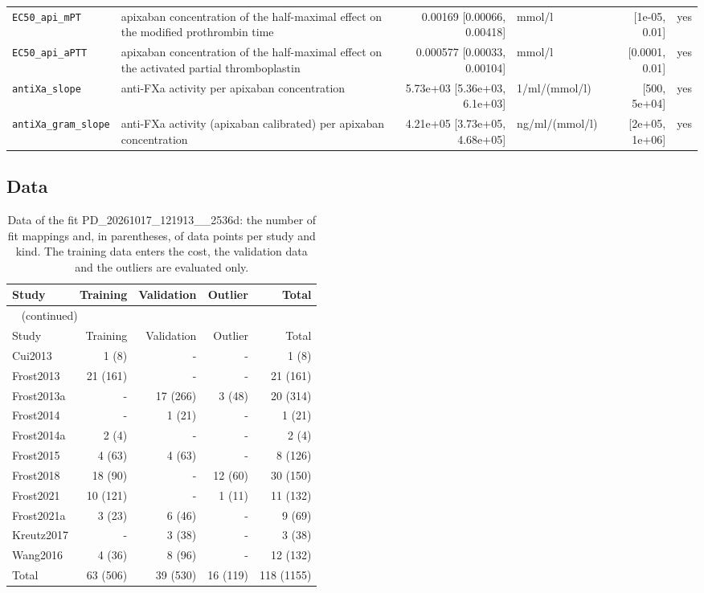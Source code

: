 \begin{longtable}{llrlrl}
\texttt{EC50\_api\_mPT} & apixaban concentration of the half-maximal effect on the modified prothrombin time & 0.00169 [0.00066, 0.00418] & mmol/l & [1e-05, 0.01] & yes \\
\texttt{EC50\_api\_aPTT} & apixaban concentration of the half-maximal effect on the activated partial thromboplastin & 0.000577 [0.00033, 0.00104] & mmol/l & [0.0001, 0.01] & yes \\
\texttt{antiXa\_slope} & anti-FXa activity per apixaban concentration & 5.73e+03 [5.36e+03, 6.1e+03] & 1/ml/(mmol/l) & [500, 5e+04] & yes \\
\texttt{antiXa\_gram\_slope} & anti-FXa activity (apixaban calibrated) per apixaban concentration & 4.21e+05 [3.73e+05, 4.68e+05] & ng/ml/(mmol/l) & [2e+05, 1e+06] & yes \\
\end{longtable}

\subsection{Data}

\begin{longtable}{lrrrr}
\caption{Data of the fit PD\_20261017\_121913\_\_2536d: the number of fit mappings and, in parentheses, of data points per study and kind. The training data enters the cost, the validation data and the outliers are evaluated only.}\label{tab:data:PD_20261017_121913__2536d} \\
\toprule
Study & Training & Validation & Outlier & Total \\
\midrule
\endfirsthead
\multicolumn{5}{l}{\small\tablename~\thetable{} (continued)} \\
\toprule
Study & Training & Validation & Outlier & Total \\
\midrule
\endhead
\bottomrule
\endlastfoot
Cui2013 & 1 (8) & - & - & 1 (8) \\
Frost2013 & 21 (161) & - & - & 21 (161) \\
Frost2013a & - & 17 (266) & 3 (48) & 20 (314) \\
Frost2014 & - & 1 (21) & - & 1 (21) \\
Frost2014a & 2 (4) & - & - & 2 (4) \\
Frost2015 & 4 (63) & 4 (63) & - & 8 (126) \\
Frost2018 & 18 (90) & - & 12 (60) & 30 (150) \\
Frost2021 & 10 (121) & - & 1 (11) & 11 (132) \\
Frost2021a & 3 (23) & 6 (46) & - & 9 (69) \\
Kreutz2017 & - & 3 (38) & - & 3 (38) \\
Wang2016 & 4 (36) & 8 (96) & - & 12 (132) \\
Total & 63 (506) & 39 (530) & 16 (119) & 118 (1155) \\
\end{longtable}

